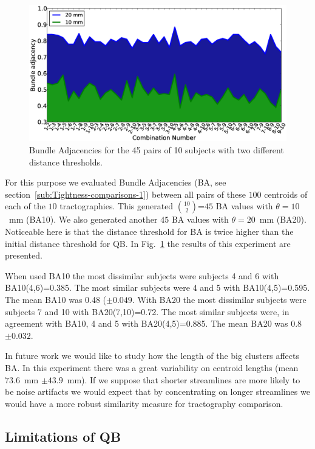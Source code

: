 \documentclass{bioinfo}
\begin{document}
\begin{figure}
\centerline{\includegraphics[scale=0.24]{Figures/Fig_13_BAs}}
\caption{Bundle Adjacencies for the 45 pairs of 10 subjects with two
  different distance thresholds. \label{Flo:BAs_plot}}
\end{figure}

For this purpose we evaluated Bundle Adjacencies
(BA, see section~\ref{sub:Tightness-comparisons-1}) between all pairs of these
$100$ centroids of each of the $10$ tractographies. This generated
${10}\choose{2}$=$45$ BA values with $\theta=10$~mm (BA10). We also
generated another $45$ BA values with $\theta=20$~mm (BA20). Noticeable
here is that the distance threshold for BA is twice higher than the
initial distance threshold for QB. In Fig.~\ref{Flo:BAs_plot} the
results of this experiment are presented.

When used BA10 the most dissimilar subjects were subjects 4 and 6 with
BA10(4,6)=0.385. The most similar subjects were 4 and 5 with
BA10(4,5)=0.595. The mean BA10 was 0.48 ($\pm\num{0.049}$. With BA20
the most dissimilar subjects were subjects 7 and 10 with
BA20(7,10)=0.72. The most similar subjects were, in agreement with BA10,
4 and 5 with BA20(4,5)=0.885. The mean BA20 was 0.8 $\pm\num{0.032}$.

In future work we would like to study how the length of the big clusters
affects BA. In this experiment there was a great variability on centroid
lengths (mean $73.6$~mm $\pm\num{43.9}$~mm). If we suppose that shorter
streamlines are more likely to be noise artifacts we would expect that
by concentrating on longer streamlines we would have a more robust
similarity measure for tractography comparison.


\subsection{Limitations of QB\label{sub:short_tracks}}
\end{document}
